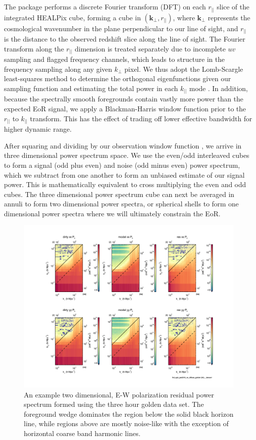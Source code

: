 \documentclass[iop]{emulateapj}
\begin{document}
The \eppsilon package performs a discrete Fourier transform (DFT) on each $r_{||}$ slice of 
the integrated HEALPix cube, forming a cube in $(\mathbf{k}_{\perp},r_{||})$, where $
\mathbf{k}_{\perp}$ represents the cosmological wavenumber in the plane perpendicular to 
our line of sight, and $r_{||}$ is the distance to the observed redshift slice along the line of 
sight. The Fourier transform along the $r_{||}$ dimension is treated separately due to 
incomplete $uv$ sampling and flagged frequency channels, which leads to structure in the 
frequency sampling along any given $k_{\perp}$ pixel. We thus adopt the Lomb-Scargle 
least-squares method to determine the orthogonal eigenfunctions given our sampling 
function and estimating the total power in each $k_{||}$ mode \citep{Scargle:1982}. In 
addition, because the spectrally smooth foregrounds contain vastly more power than the 
expected EoR signal, we apply a Blackman-Harris window function prior to the $r_{||}$ to 
$k_{||}$ transform. This has the effect of trading off lower effective bandwidth for higher 
dynamic range.

After squaring and dividing by our observation window function \citep{Bowman:2006}, we 
arrive in three dimensional power spectrum space. We use the even/odd interleaved cubes 
to form a signal (odd plus even) and noise (odd minus even) power spectrum, which we 
subtract from one another to form an unbiased estimate of our signal power. This is 
mathematically equivalent to cross multiplying the even and odd cubes. The three 
dimensional power spectrum cube can next be averaged in annuli to form two dimensional 
power spectra, or spherical shells to form one dimensional power spectra where we will 
ultimately constrain the EoR.

\begin{figure}
\begin{center}
\includegraphics[width=.9\columnwidth]{example_ps.pdf}
\caption{
An example two dimensional, E-W polarization residual power spectrum formed using the 
three hour golden data set. The foreground wedge dominates the region below the solid 
black horizon line, while regions above are mostly noise-like with the exception of horizontal 
coarse band harmonic lines. 
\label{fig:example_ps}
}
\end{center}
\end{figure}
\end{document}
